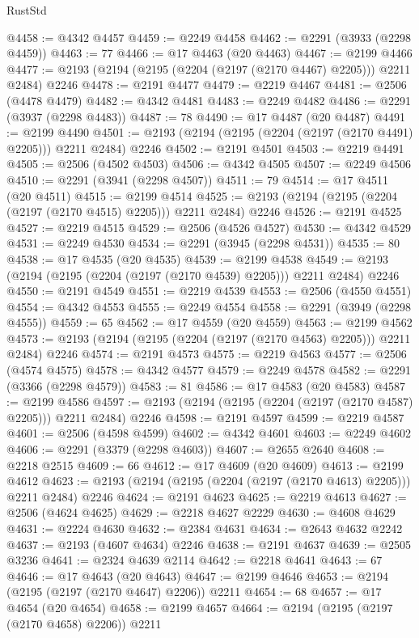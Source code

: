 \begin{lexlean}{RustStd}
\begin{coremodule}
@4458 := @4342 @4457
@4459 := @2249 @4458
@4462 := @2291 (@3933 (@2298 @4459))
@4463 := 77
@4466 := @17 @4463 (@20 @4463)
@4467 := @2199 @4466
@4477 := @2193 (@2194 (@2195 (@2204 (@2197 (@2170 @4467) @2205))) @2211 @2484) @2246
@4478 := @2191 @4477
@4479 := @2219 @4467
@4481 := @2506 (@4478 @4479)
@4482 := @4342 @4481
@4483 := @2249 @4482
@4486 := @2291 (@3937 (@2298 @4483))
@4487 := 78
@4490 := @17 @4487 (@20 @4487)
@4491 := @2199 @4490
@4501 := @2193 (@2194 (@2195 (@2204 (@2197 (@2170 @4491) @2205))) @2211 @2484) @2246
@4502 := @2191 @4501
@4503 := @2219 @4491
@4505 := @2506 (@4502 @4503)
@4506 := @4342 @4505
@4507 := @2249 @4506
@4510 := @2291 (@3941 (@2298 @4507))
@4511 := 79
@4514 := @17 @4511 (@20 @4511)
@4515 := @2199 @4514
@4525 := @2193 (@2194 (@2195 (@2204 (@2197 (@2170 @4515) @2205))) @2211 @2484) @2246
@4526 := @2191 @4525
@4527 := @2219 @4515
@4529 := @2506 (@4526 @4527)
@4530 := @4342 @4529
@4531 := @2249 @4530
@4534 := @2291 (@3945 (@2298 @4531))
@4535 := 80
@4538 := @17 @4535 (@20 @4535)
@4539 := @2199 @4538
@4549 := @2193 (@2194 (@2195 (@2204 (@2197 (@2170 @4539) @2205))) @2211 @2484) @2246
@4550 := @2191 @4549
@4551 := @2219 @4539
@4553 := @2506 (@4550 @4551)
@4554 := @4342 @4553
@4555 := @2249 @4554
@4558 := @2291 (@3949 (@2298 @4555))
@4559 := 65
@4562 := @17 @4559 (@20 @4559)
@4563 := @2199 @4562
@4573 := @2193 (@2194 (@2195 (@2204 (@2197 (@2170 @4563) @2205))) @2211 @2484) @2246
@4574 := @2191 @4573
@4575 := @2219 @4563
@4577 := @2506 (@4574 @4575)
@4578 := @4342 @4577
@4579 := @2249 @4578
@4582 := @2291 (@3366 (@2298 @4579))
@4583 := 81
@4586 := @17 @4583 (@20 @4583)
@4587 := @2199 @4586
@4597 := @2193 (@2194 (@2195 (@2204 (@2197 (@2170 @4587) @2205))) @2211 @2484) @2246
@4598 := @2191 @4597
@4599 := @2219 @4587
@4601 := @2506 (@4598 @4599)
@4602 := @4342 @4601
@4603 := @2249 @4602
@4606 := @2291 (@3379 (@2298 @4603))
@4607 := @2655 @2640
@4608 := @2218 @2515
@4609 := 66
@4612 := @17 @4609 (@20 @4609)
@4613 := @2199 @4612
@4623 := @2193 (@2194 (@2195 (@2204 (@2197 (@2170 @4613) @2205))) @2211 @2484) @2246
@4624 := @2191 @4623
@4625 := @2219 @4613
@4627 := @2506 (@4624 @4625)
@4629 := @2218 @4627 @2229
@4630 := @4608 @4629
@4631 := @2224 @4630
@4632 := @2384 @4631
@4634 := @2643 @4632 @2242
@4637 := @2193 (@4607 @4634) @2246
@4638 := @2191 @4637
@4639 := @2505 @3236
@4641 := @2324 @4639 @2114
@4642 := @2218 @4641
@4643 := 67
@4646 := @17 @4643 (@20 @4643)
@4647 := @2199 @4646
@4653 := @2194 (@2195 (@2197 (@2170 @4647) @2206)) @2211
@4654 := 68
@4657 := @17 @4654 (@20 @4654)
@4658 := @2199 @4657
@4664 := @2194 (@2195 (@2197 (@2170 @4658) @2206)) @2211

\end{coremodule}
\end{lexlean}
